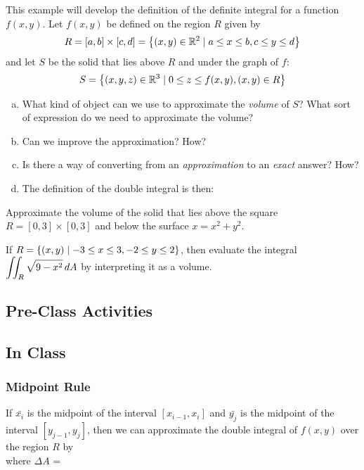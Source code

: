 \documentclass[notes]{subfiles}
\begin{document}
		\begin{ex}
			This example will develop the definition of the definite integral for a function $f(x,y)$.  Let $f(x,y)$ be defined on the region $R$ given by
				\[R = [a,b]\times [c,d] = \left\lbrace (x,y)\in\mathbb{R}^2\mid a\leq x\leq b, c\leq y\leq d \right\rbrace\]and let $S$ be the solid that lies above $R$ and under the graph of $f$:
				\[S = \left\lbrace (x,y,z)\in\mathbb{R}^3\mid 0\leq z\leq f(x,y), (x,y)\in R \right\rbrace\]
				\begin{enumerate}[(a)]
					\item What kind of object can we use to approximate the \textit{volume} of $S$?  What sort of expression do we need to approximate the volume?
						
					\item Can we improve the approximation?  How?
						
					\item Is there a way of converting from an \emph{approximation} to an \emph{exact} answer?  How?
						
					\item The definition of the double integral is then:
				\end{enumerate}
		\end{ex}
			\newpage
			
		\begin{ex}
			Approximate the volume of the solid that lies above the square $R = [0,3]\times[0,3]$ and below the surface $x=x^2+y^2$.
		\end{ex}
			\vs{1}
			
		\begin{ex}
			If $R = \left\lbrace (x,y)\mid -3\leq x\leq 3, -2\leq y\leq 2 \right\rbrace$, then evaluate the integral $\displaystyle \iint_R \sqrt{9-x^2}\,dA$ by interpreting it as a volume.
		\end{ex}
			\vs{1}
			\newpage
				
	\subsection*{Pre-Class Activities}
		\newpage
		
	\subsection*{In Class}
	
	\subsubsection*{Midpoint Rule}
		\begin{defn}
			If $\bar{x_i}$ is the midpoint of the interval $[x_{i-1},x_i]$ and $\bar{y_j}$ is the midpoint of the interval $[y_{j-1},y_j]$, then we can approximate the double integral of $f(x,y)$ over the region $R$ by\\[30pt]
			
			where $\Delta A$ = 
		\end{defn}
	
\end{document}
